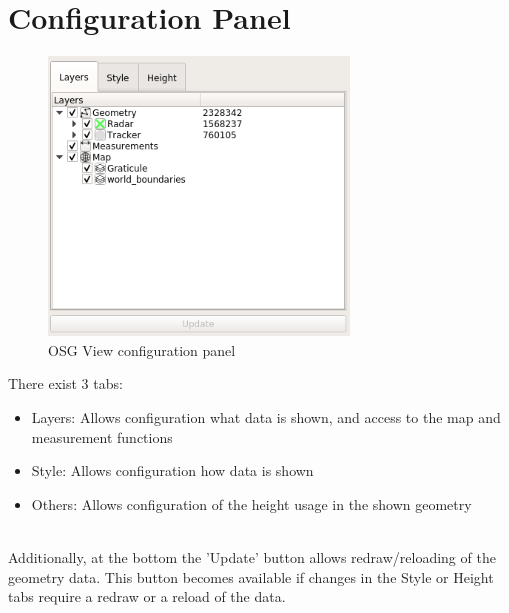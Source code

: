 \section{Configuration Panel}
\label{sec:osgview_config_panel}

\begin{figure}[H]
    \includegraphics[width=8cm,frame]{figures/osgview_config_panel.png}
  \caption{OSG View configuration panel}
\end{figure}

There exist 3 tabs:
\begin{itemize}
 \item Layers: Allows configuration what data is shown, and access to the map and measurement functions
 \item Style: Allows configuration how data is shown
 \item Others: Allows configuration of the height usage in the shown geometry
\end{itemize}
\ \\

Additionally, at the bottom the 'Update' button allows redraw/reloading of the geometry data. This button becomes available if changes in the Style or Height tabs require a redraw or a reload of the data. \\


 
 
